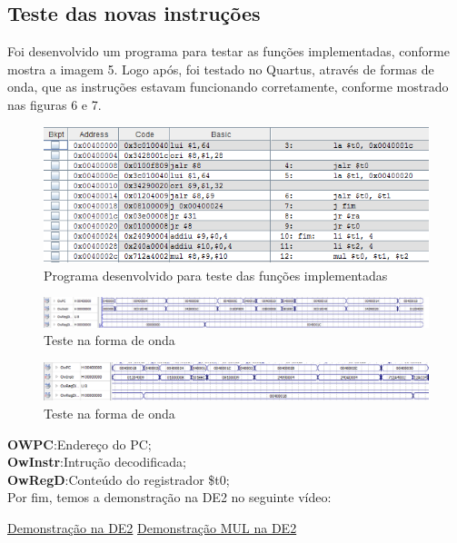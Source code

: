 \documentclass[12pt]{article}
\begin{document}
\subsection{Teste das novas instruções}
\label{subsec:testeisa}

Foi desenvolvido um programa para testar as funções implementadas, conforme mostra a imagem 5. Logo após, foi testado no Quartus, através de formas de onda, que as instruções estavam funcionando corretamente, conforme mostrado nas figuras 6 e 7.   

\begin{figure}[H]
	\flushleft
	\includegraphics[width=1\textwidth]{programa.png}
	\caption{Programa desenvolvido para teste das funções implementadas}
	\label{fig:pest}
\end{figure}
\begin{figure}[H]
	\flushleft
	\includegraphics[width=1\textwidth]{teste.png}
	\caption{Teste na forma de onda}
	\label{fig:pest}
\end{figure}
\begin{figure}[H]
	\flushleft
	\includegraphics[width=1\textwidth]{images/teste1.png}
	\caption{Teste na forma de onda}
	\label{fig:pest}
\end{figure}


\textbf{OWPC}:Endereço do PC;\\
\textbf{OwInstr}:Intrução decodificada;\\
\textbf{OwRegD}:Conteúdo do registrador \$t0;\\



Por fim, temos a demonstração na DE2 no seguinte vídeo:

\href{https://youtu.be/aTrqM8m8FJc}{Demonstração na DE2}
\href{https://youtu.be/OFwDDysXQxM}{Demonstração MUL na DE2}



\end{document}
